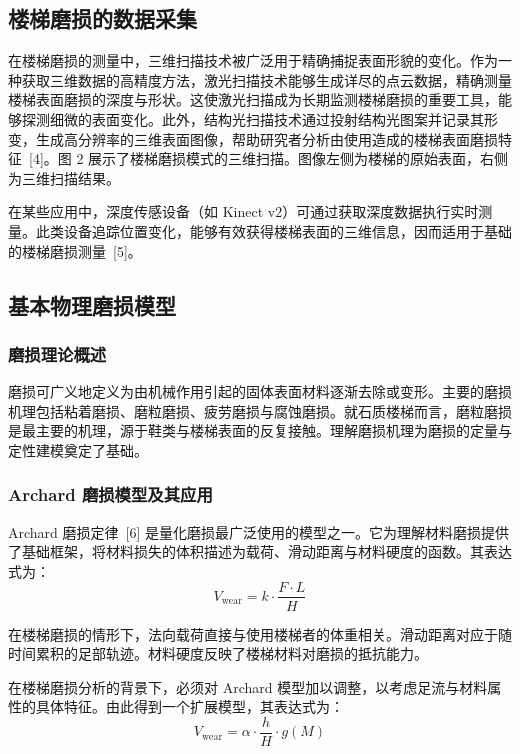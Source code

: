 \documentclass[11pt,a4paper]{ctexart}
\begin{document}
\subsection{楼梯磨损的数据采集}

在楼梯磨损的测量中，三维扫描技术被广泛用于精确捕捉表面形貌的变化。作为一种获取三维数据的高精度方法，激光扫描技术能够生成详尽的点云数据，精确测量楼梯表面磨损的深度与形状。这使激光扫描成为长期监测楼梯磨损的重要工具，能够探测细微的表面变化。此外，结构光扫描技术通过投射结构光图案并记录其形变，生成高分辨率的三维表面图像，帮助研究者分析由使用造成的楼梯表面磨损特征~[4]。图 2 展示了楼梯磨损模式的三维扫描。图像左侧为楼梯的原始表面，右侧为三维扫描结果。

在某些应用中，深度传感设备（如 Kinect v2）可通过获取深度数据执行实时测量。此类设备追踪位置变化，能够有效获得楼梯表面的三维信息，因而适用于基础的楼梯磨损测量~[5]。

\subsection{基本物理磨损模型}

\subsubsection{磨损理论概述}

磨损可广义地定义为由机械作用引起的固体表面材料逐渐去除或变形。主要的磨损机理包括粘着磨损、磨粒磨损、疲劳磨损与腐蚀磨损。就石质楼梯而言，磨粒磨损是最主要的机理，源于鞋类与楼梯表面的反复接触。理解磨损机理为磨损的定量与定性建模奠定了基础。

\subsubsection{Archard 磨损模型及其应用}

Archard 磨损定律~[6] 是量化磨损最广泛使用的模型之一。它为理解材料磨损提供了基础框架，将材料损失的体积描述为载荷、滑动距离与材料硬度的函数。其表达式为：
\begin{equation}
V_{\mathrm{wear}} = k\cdot\frac{F\cdot L}{H}
\end{equation}

在楼梯磨损的情形下，法向载荷直接与使用楼梯者的体重相关。滑动距离对应于随时间累积的足部轨迹。材料硬度反映了楼梯材料对磨损的抵抗能力。

在楼梯磨损分析的背景下，必须对 Archard 模型加以调整，以考虑足流与材料属性的具体特征。由此得到一个扩展模型，其表达式为：
\begin{equation}
V_{\mathrm{wear}} = \alpha\cdot\frac{h}{H}\cdot g(M)
\end{equation}
\end{document}
